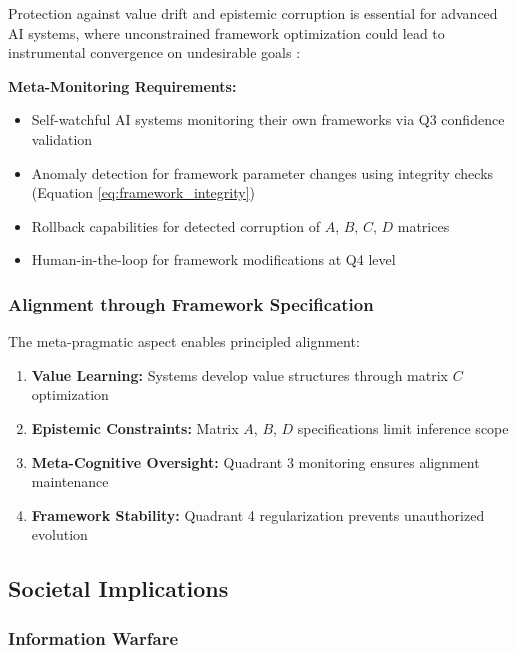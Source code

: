\documentclass[
]{article}
\providecommand{\tightlist}{%
  \setlength{\itemsep}{0pt}\setlength{\parskip}{0pt}}
\begin{document}
Protection against value drift and epistemic corruption is essential for
advanced AI systems, where unconstrained framework optimization could
lead to instrumental convergence on undesirable goals
\citep{bostrom2014superintelligence}:

\textbf{Meta-Monitoring Requirements:}

\begin{itemize}
\tightlist
\item
  Self-watchful AI systems monitoring their own frameworks via Q3
  confidence validation
\item
  Anomaly detection for framework parameter changes using integrity
  checks (Equation \eqref{eq:framework_integrity})
\item
  Rollback capabilities for detected corruption of \(A\), \(B\), \(C\),
  \(D\) matrices
\item
  Human-in-the-loop for framework modifications at Q4 level
\end{itemize}

\subsubsection{Alignment through Framework
Specification}\label{alignment-through-framework-specification}

The meta-pragmatic aspect enables principled alignment:

\begin{enumerate}
\def\labelenumi{\arabic{enumi}.}
\tightlist
\item
  \textbf{Value Learning:} Systems develop value structures through
  matrix \(C\) optimization
\item
  \textbf{Epistemic Constraints:} Matrix \(A\), \(B\), \(D\)
  specifications limit inference scope
\item
  \textbf{Meta-Cognitive Oversight:} Quadrant 3 monitoring ensures
  alignment maintenance
\item
  \textbf{Framework Stability:} Quadrant 4 regularization prevents
  unauthorized evolution
\end{enumerate}

\subsection{Societal Implications}\label{sec:societal_security}

\subsubsection{Information Warfare}\label{information-warfare}
\end{document}

